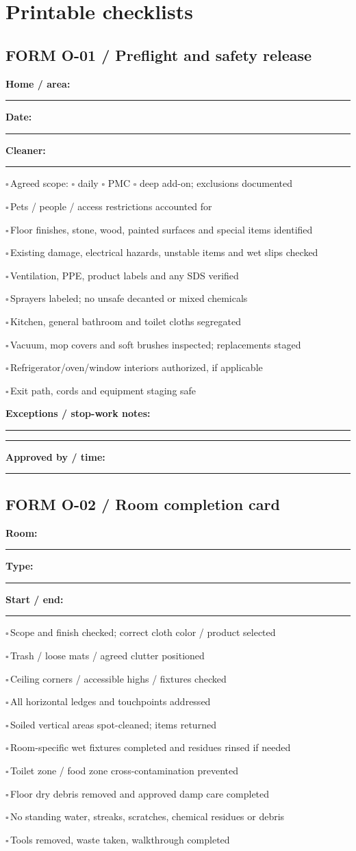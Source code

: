 \documentclass[10pt,letterpaper,oneside]{article}
\newcommand{\field}[1]{\textbf{#1}\ \rule{0.22\linewidth}{0.3pt}}
\newcommand{\tick}{\ensuremath{\square}\,}
\newcommand{\task}[1]{\par\noindent\tick #1\par}
\begin{document}
\section{Printable checklists}
\newpage\subsection*{FORM O-01 / Preflight and safety release}
\field{Home / area:} \qquad \textbf{Date:} \rule{1.2in}{.3pt} \qquad \textbf{Cleaner:} \rule{1in}{.3pt}
\begin{plainbox}
\task{Agreed scope: \(\square\) daily \(\square\) PMC \(\square\) deep add-on; exclusions documented}
\task{Pets / people / access restrictions accounted for}
\task{Floor finishes, stone, wood, painted surfaces and special items identified}
\task{Existing damage, electrical hazards, unstable items and wet slips checked}
\task{Ventilation, PPE, product labels and any SDS verified}
\task{Sprayers labeled; no unsafe decanted or mixed chemicals}
\task{Kitchen, general bathroom and toilet cloths segregated}
\task{Vacuum, mop covers and soft brushes inspected; replacements staged}
\task{Refrigerator/oven/window interiors authorized, if applicable}
\task{Exit path, cords and equipment staging safe}
\end{plainbox}
\textbf{Exceptions / stop-work notes:}\par\rule{\linewidth}{.3pt}\par\vspace{13pt}\rule{\linewidth}{.3pt}
\textbf{Approved by / time:} \rule{.68\linewidth}{.3pt}
\newpage\subsection*{FORM O-02 / Room completion card}
\textbf{Room:} \rule{1.5in}{.3pt}\quad\textbf{Type:} \rule{1.5in}{.3pt}\quad\textbf{Start / end:} \rule{1.1in}{.3pt}
\begin{plainbox}
\task{Scope and finish checked; correct cloth color / product selected}
\task{Trash / loose mats / agreed clutter positioned}
\task{Ceiling corners / accessible highs / fixtures checked}
\task{All horizontal ledges and touchpoints addressed}
\task{Soiled vertical areas spot-cleaned; items returned}
\task{Room-specific wet fixtures completed and residues rinsed if needed}
\task{Toilet zone / food zone cross-contamination prevented}
\task{Floor dry debris removed and approved damp care completed}
\task{No standing water, streaks, scratches, chemical residues or debris}
\task{Tools removed, waste taken, walkthrough completed}
\end{plainbox}
\end{document}
